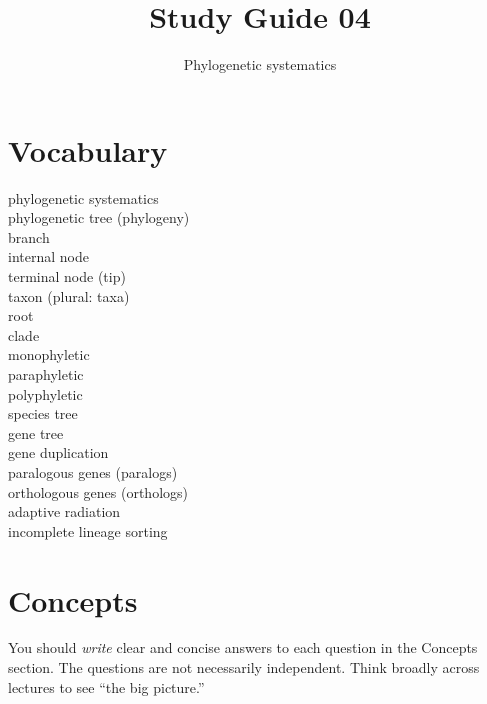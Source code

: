 \documentclass[letterpaper]{tufte-handout}
\title{Study Guide 04\hfill}
\author{Phylogenetic systematics}
\date{} %
\begin{document}
\maketitle	%


\section{Vocabulary}
\vspace{-1\baselineskip}
\begin{multicols}{2}
	phylogenetic systematics\\
	phylogenetic tree (phylogeny)\\
	branch \\
	internal node\\
	terminal node (tip) \\
	taxon (plural: taxa) \\
	root \\
	clade \\
	monophyletic \\
	paraphyletic \\
	polyphyletic \\
	species tree \\
	gene tree \\
	gene duplication \\
	paralogous genes (paralogs) \\
	orthologous genes (orthologs) \\
	adaptive radiation \\
	incomplete lineage sorting \\
\end{multicols}

\section{Concepts}

You should \emph{write} clear and concise answers to each question in the Concepts section.  The questions are not necessarily independent.  Think broadly across lectures to see ``the big picture.'' 
\end{document}
